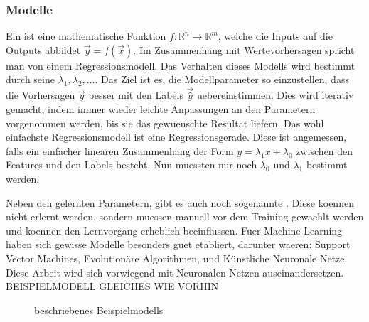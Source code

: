 \documentclass[../main]{subfiles}
\begin{document}
\subsubsection{Modelle}
Ein  ist eine mathematische Funktion $\mathit{f}\colon \mathbb{R}^n \to \mathbb{R}^m$, welche die Inputs auf die Outputs abbildet $\vec{y}=\mathit{f}(\vec{x})$.
Im Zusammenhang mit Wertevorhersagen spricht man von einem Regressionsmodell.
Das Verhalten dieses Modells wird bestimmt durch seine  $\lambda_1, \lambda_2,\ldots$.
Das Ziel ist es, die Modellparameter so einzustellen, dass die Vorhersagen $\vec{y}$ besser mit den Labels $\vec{\hat{y}}$ uebereinstimmen.
Dies wird iterativ gemacht, indem immer wieder leichte Anpassungen an den Parametern vorgenommen werden, bis sie das gewuenschte Resultat liefern.
\para
Das wohl einfachste Regressionsmodell ist eine Regressionsgerade. Diese ist
angemessen, falls ein einfacher linearen Zusammenhang der Form $y=\lambda_1x +
\lambda_0$ zwischen den Features und den Labels besteht.
Nun muessten nur noch $\lambda_0$ und $\lambda_1$ bestimmt werden.

Neben den gelernten Parametern, gibt es auch noch sogenannte .
Diese koennen nicht erlernt werden, sondern muessen manuell vor dem Training gewaehlt werden und koennen den Lernvorgang erheblich beeinflussen.
\para
Fuer Machine Learning haben sich gewisse Modelle besonders guet etabliert,
darunter waeren: Support Vector Machines, Evolutionäre Algorithmen, und Künstliche Neuronale Netze.
Diese Arbeit wird sich vorwiegend mit Neuronalen Netzen auseinandersetzen.
\para
BEISPIELMODELL GLEICHES WIE VORHIN

\begin{figure}[h!]
  \centering


  \caption{beschriebenes Beispielmodells}
\end{figure}
\end{document}
